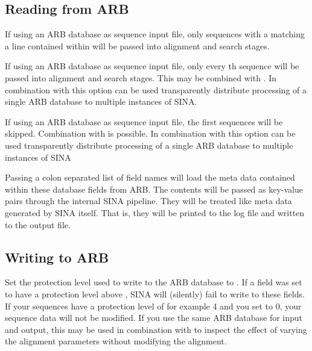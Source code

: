 \documentclass[english,a4paper]{article}
\begin{document}
\subsection{Reading from ARB}
\begin{Description}
\item[\OptArg{-{}-select-file }{filename}]
If using an ARB database as sequence input file, only sequences with a  matching a line contained
within  will be passed into alignment and search stages. 
\item[\OptArg{-{}-select-step }{n}]
If using an ARB database as sequence input file, only every th sequence will 
be passed into alignment and search stages. This may be combined with .
In combination with  this option can be used
transparently distribute processing of a single ARB database to multiple instances of SINA. 
\item[\OptArg{-{}-select-skip }{n}]
If using an ARB database as sequence input file, the first  sequences will be skipped. Combination
with  is possible. In combination with  this option can be used
transparently distribute processing of a single ARB database to multiple instances of SINA
\item[\OptArg{-{}-extra-fields }{fieldnames}]
Passing a colon separated list of field names will load the meta data contained within these database fields
from ARB. The contents will be passed as key-value pairs through the internal SINA pipeline. They will 
be treated like meta data generated by SINA itself. That is, they will be printed to the log file and
written to the output file. 
\end{Description}
\subsection{Writing to ARB}
\begin{Description}
\item[\OptArg{-{}-prot-level }{n}]
Set the protection level used to write to the ARB database to . If a field was set to have a protection 
level above , SINA will (silently) fail to write to these fields. If your sequences have a protection 
level of for example 4 and you set  to 0, your sequence data will not be modified. If you use the 
same ARB database for input and output, this may be used in combination with  to inspect
the effect of varying the alignment parameters without modifying the alignment.
\end{Description}
\end{document}
